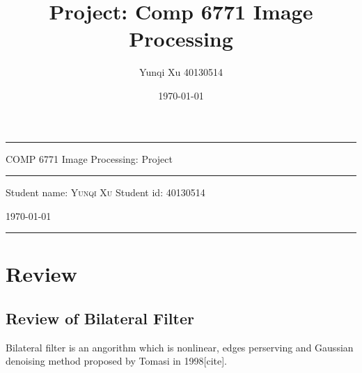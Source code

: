 \documentclass[12pt]{article}
\title{Project: Comp 6771 Image Processing}
\author{Yunqi Xu 40130514}
\date{\today}
\begin{document}
\begin{titlepage}
  \rule{\textwidth}{1pt}   %
    \vspace{0.2\textheight}  %


    {\Huge COMP 6771 Image Processing: Project}

    \vspace{0.025\textheight}   %

    \rule{0.83\textwidth}{0.4pt}  %

    \vspace{0.1\textheight}  %


    {\Large Student name: \textsc{Yunqi Xu}}
    \vfill
    {\Large Student id: 40130514}
    \vfill  %

    {\large \today}
    \vspace{0.1\textheight}  %


    \rule{\textwidth}{1pt}  %
\end{titlepage}

\section{Review}
\subsection{Review of Bilateral Filter}
Bilateral filter is an angorithm which is nonlinear, edges perserving and Gaussian denoising method proposed by Tomasi in 1998[cite]. 
\end{document}
